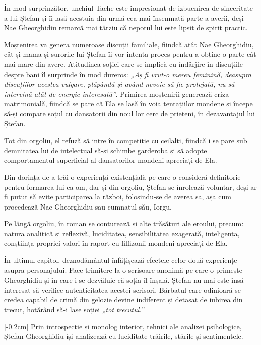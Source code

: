 În mod surprinzător, unchiul Tache este impresionat de izbucnirea de sinceritate a lui Ștefan și îi lasă acestuia din urmă cea mai însemnată parte a averii, deși Nae Gheorghidiu remarcă mai târziu că nepotul lui este lipsit de spirit practic.

Moștenirea va genera numeroase discuții familiale, fiindcă atât Nae Gheorghidiu, cât și mama și surorile lui Ștefan îi vor intenta proces pentru a obține o parte cât mai mare din avere. Atitudinea soției care se implică cu îndârjire în discuțiile despre bani îl surprinde în mod dureros: \textit{„Aș fi vrut-o mereu feminină, deasupra discuțiilor acestea vulgare, plăpândă și având nevoie să fie protejată, nu să intervină atât de energic interesată”}. Primirea moștenirii generează criza matrimonială, fiindcă se pare că Ela se lasă în voia tentațiilor mondene și începe să-și compare soțul cu dansatorii din noul lor cerc de prieteni, în dezavantajul lui Ștefan.

Tot din orgoliu, el refuză să intre în competiție cu ceilalți, fiindcă i se pare sub demnitatea lui de intelectual să-și schimbe garderoba și să adopte comportamentul superficial al dansatorilor mondeni apreciați de Ela.

Din dorința de a trăi o experiență existențială pe care o consideră definitorie pentru formarea lui ca om, dar și din orgoliu, Ștefan se înrolează voluntar, deși ar fi putut să evite participarea la război, folosindu-se de averea sa, așa cum procedează Nae Gheorghidiu sau cumnatul său, Iorgu.

Pe lângă orgoliu, în roman se conturează și alte trăsături ale eroului, precum: natura analitică și reflexivă, luciditatea, sensibilitatea exagerată, inteligența, conștiința propriei valori în raport cu filfizonii mondeni apreciați de Ela.

În ultimul capitol, deznodământul înfățișează efectele celor două experiențe asupra personajului. Face trimitere la o scrisoare anonimă pe care o primește Gheorghidiu și în care i se dezvăluie că soția îl înșală. Ștefan nu mai este însă interesat să verifice autenticitatea acestei scrisori. Bărbatul care odinioară se credea capabil de crimă din gelozie devine indiferent și detașat de iubirea din trecut, hotărând să-i lase soției \textit{„tot trecutul.”}

[-0.2cm]
Prin introspecție și monolog interior, tehnici ale analizei psihologice, Ștefan Gheorghidiu își analizează cu luciditate trăirile, stările și sentimentele.


